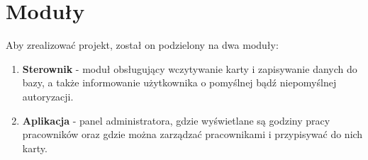 \section{Moduły}

Aby zrealizować projekt, został on podzielony na dwa moduły:

\begin{enumerate}
  \item \textbf{Sterownik} - moduł obsługujący wczytywanie karty i zapisywanie danych do bazy, a także informowanie użytkownika o pomyślnej bądź niepomyślnej autoryzacji.
  \item \textbf{Aplikacja} - panel administratora, gdzie wyświetlane są godziny pracy pracowników oraz gdzie można zarządzać pracownikami i przypisywać do nich karty.
\end{enumerate}
